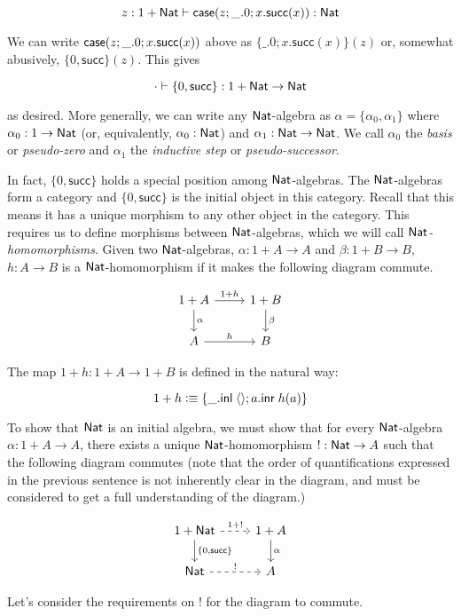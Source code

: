 \documentclass[11pt]{article}
\newcommand*{\z}{0}
\newcommand*{\s}{\mathsf{succ}}
\newcommand*{\dummy}{\_}
\newcommand*{\triv}{\langle \rangle}
\begin{document}
\[z: 1 + \Nat \entails \case(z; \dummy. \z; x. \s(x)) : \Nat\]

We can write $\case(z; \dummy. \z; x. \s(x))$
above as $\{\dummy. \z; x. \s(x)\}(z)$ or, somewhat abusively,
$\{\z, \s\}(z)$. This gives

\[\cdot \entails \{\z, \s\} : 1 + \Nat \to \Nat\]

as desired. More generally, we can write any $\mathsf{Nat}$-algebra as
$\alpha = \{\alpha_0, \alpha_1\}$ where $\alpha_0 : 1 \to \mathsf{Nat}$ (or,
equivalently, $\alpha_0 : \mathsf{Nat}$) and $\alpha_1: \mathsf{Nat} \to \mathsf{Nat}$. We call
$\alpha_0$ the {\em basis} or {\em pseudo-zero} and $\alpha_1$ the
{\em inductive step} or {\em pseudo-successor}.

In fact, $\{\z, \s\}$ holds a special position among $\mathsf{Nat}$-algebras.
The $\mathsf{Nat}$-algebras form a category and $\{\z, \s\}$ is the initial object
in this category. Recall that this means it has a unique morphism to any other
object in the category. This requires us to define morphisms between
$\mathsf{Nat}$-algebras, which we will call {\em $\mathsf{Nat}$-homomorphisms}. Given two
$\mathsf{Nat}$-algebras, $\alpha : 1 + A \to A$ and $\beta: 1 + B \to B$,
$h: A \to B$ is a $\mathsf{Nat}$-homomorphism if it makes the following diagram commute.

\[
\begin{tikzcd}
1+A \arrow{d}{\alpha} \arrow{r}{1+h} & 1+B \arrow{d}{\beta}\\
A \arrow{r}{h} & B
\end{tikzcd}
\]

The map $1 + h: 1 + A \to 1 + B$ is defined in the natural way:

\[1 + h \defeq \{\dummy. \inl\; \triv; a. \inr\; h(a)\}\]

To show that $\mathsf{Nat}$ is an initial algebra, we must show that for every
$\mathsf{Nat}$-algebra
$\alpha: 1 + A \to A$, there exists a unique $\mathsf{Nat}$-homomorphism $!: \mathsf{Nat} \to A$
such that the following diagram commutes (note that the order of
quantifications expressed in the previous sentence is not inherently clear in
the diagram, and must be considered to get a full understanding of the
diagram.)

\[
\begin{tikzcd}
1+\Nat \arrow{d}{\{\z, \s\}} \arrow[dashed]{r}{1+!} & 1+A \arrow{d}{\alpha}\\
\Nat \arrow[dashed]{r}{!} & A
\end{tikzcd}
\]

Let's consider the requirements on $!$ for the diagram to commute.
\end{document}
